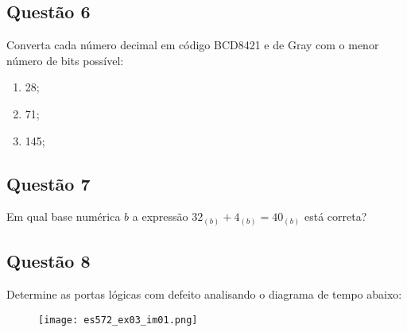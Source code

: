 \documentclass{article}
\begin{document}
        \subsection{Questão 6}
            \begin{exercise}
                Converta cada número decimal em código BCD8421 e de Gray com o menor número de bits possível:
                    \begin{enumerate}[noitemsep]
                        \item 28;
                        \item 71;
                        \item 145;
                    \end{enumerate}
            \end{exercise}
            \begin{resolution}

            \end{resolution}
\newpage

        \subsection{Questão 7}
            \begin{exercise}
                Em qual base numérica $b$ a expressão $32_{(b)} + 4_{(b)} = 40_{(b)}$ está correta?
            \end{exercise}
            \begin{resolution}

            \end{resolution}
\newpage

        \subsection{Questão 8}
            \begin{exercise}
                Determine as portas lógicas com defeito analisando o diagrama de tempo abaixo:
                    \begin{figure}[H]
                        \centering
                        \texttt{[image: es572\_ex03\_im01.png]}
                    \end{figure} \noindent
            \end{exercise}
            \begin{resolution}

            \end{resolution}
\end{document}
